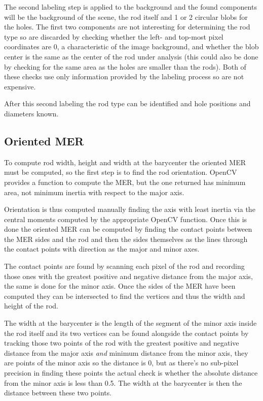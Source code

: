 The second labeling step is applied to the background and the found components will be the background of the scene, the rod itself and 1 or 2 circular blobs for the holes.
The first two components are not interesting for determining the rod type so are discarded by checking whether the left- and top-most pixel coordinates are 0, a characteristic of the image background, and whether the blob center is the same as the center of the rod under analysis (this could also be done by checking for the same area as the holes are smaller than the rods).
Both of these checks use only information provided by the labeling process so are not expensive.

After this second labeling the rod type can be identified and hole positions and diameters known.

\subsection{Oriented MER}
To compute rod width, height and width at the barycenter the oriented MER must be computed, so the first step is to find the rod orientation.
OpenCV provides a function to compute the MER, but the one returned has minimum area, not minimum inertia with respect to the major axis.

Orientation is thus computed manually finding the axis with least inertia via the central moments computed by the appropriate OpenCV function.
Once this is done the oriented MER can be computed by finding the contact points between the MER sides and the rod and then the sides themselves as the lines through the contact points with direction as the major and minor axes.

The contact points are found by scanning each pixel of the rod and recording those ones with the greatest positive and negative distance from the major axis, the same is done for the minor axis.
Once the sides of the MER have been computed they can be intersected to find the vertices and thus the width and height of the rod.

The width at the barycenter is the length of the segment of the minor axis inside the rod itself and its two vertices can be found alongside the contact points by tracking those two points of the rod with the greatest positive and negative distance from the major axis \textit{and} minimum distance from the minor axis, \ie they are points of the minor axis so the distance is 0, but as there's no sub-pixel precision in finding these points the actual check is whether the absolute distance from the minor axis is less than 0.5.
The width at the barycenter is then the distance between these two points.

